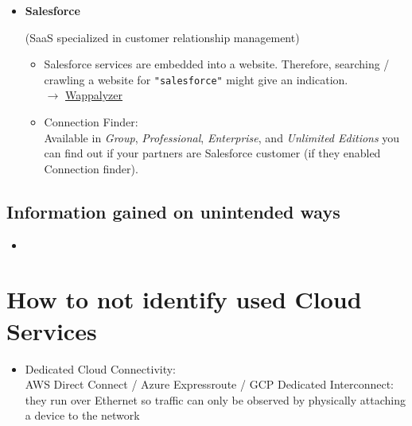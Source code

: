 \documentclass[12pt]{article}
\begin{document}
\begin{itemize}
    
    \item \textbf{Salesforce}
    
    (SaaS specialized in customer relationship management)
    
    \begin{itemize}
        \item Salesforce services are embedded into a website. Therefore, searching / crawling a website for \verb|"salesforce"| might give an indication. \\
        $\rightarrow$ \href{https://www.wappalyzer.com/lists/?technologies=salesforce}{Wappalyzer}
        
        \item Connection Finder: \\
        Available in \textit{Group}, \textit{Professional}, \textit{Enterprise}, and \textit{Unlimited Editions} you can find out if your partners are Salesforce customer (if they enabled Connection finder).
    \end{itemize}
    
    
    

 
\end{itemize}

\subsection*{Information gained on unintended ways}
\begin{itemize}
    \item 
\end{itemize}


\newpage
\section*{How to not identify used Cloud Services}
\begin{itemize}
    \item Dedicated Cloud Connectivity: \\ AWS Direct Connect / Azure Expressroute / GCP Dedicated Interconnect: they run over Ethernet so traffic can only be observed by physically attaching a device to the network
\end{itemize}
\end{document}
